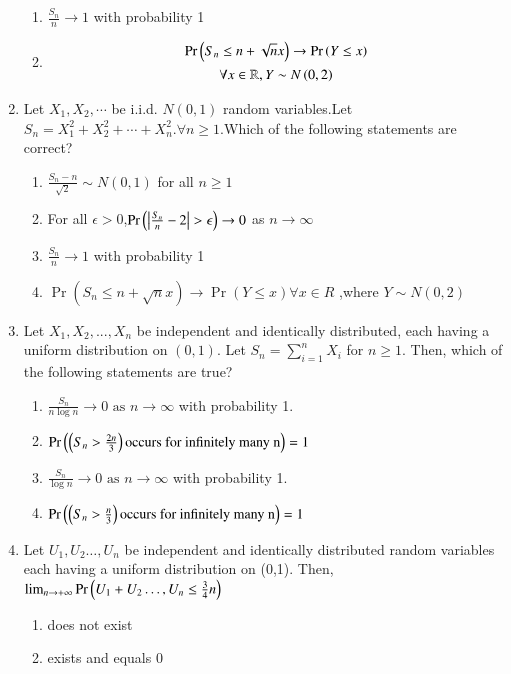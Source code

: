 \begin{enumerate}[label=\thesection.\arabic*.,ref=\thesection.\theenumi]
\begin{enumerate}
\item $\frac{S_{n}}{n} \to 1$ with probability 1
\item 
\begin{multline}
    \Pr\left({S_{n} \leq n+\sqrt{n}x}\right) \to \Pr\left({Y \leq x}\right)
    \\
    \forall x\in \mathbb{R}, Y \sim N\left(0,2\right)
\end{multline}
%
\end{enumerate}
%
\item Let $X_1,X_2, \cdots$ be i.i.d. $N(0,1)$ random variables.Let $S_{n}=X_{1}^2+X_{2}^2+\cdots+X_{n}^2.\forall n\geq 1.$Which of the following statements are correct?
\begin{enumerate}
\setlength\itemsep{1em}
\item $\frac{S_{n}-n}{\sqrt{2}}\sim N(0,1)$ for all $n\geq 1$
\item For all $\epsilon > 0$,$\Pr{\brak{\left|\frac{S_n}{n}-2\right|>\epsilon}}\to 0$ as $n \to \infty$
\item $\frac{S_{n}}{n} \to 1$ with probability 1
\item $\Pr({S_{n} \leq n+\sqrt{n}x}) \to \Pr({Y \leq x}) \forall x\in R$ ,where $Y \sim N(0,2)$
\end{enumerate}
%
\solution

%
\item Let $X_1,X_2,...,X_n$ be independent and identically distributed, each having a uniform distribution on $(0,1)$. Let $S_n=\sum_{i=1}^{n}X_i$ for $n\ge 1$. Then, which of the following statements are true? 
\begin{enumerate}[label=\Alph*)]
\item $\frac{S_n}{n \log{n}}\to 0 \text{ as } n \to \infty$ with probability 1.
\item $\Pr\left(\left(S_n>\frac{2n}{3}\right)\text{occurs for infinitely many n}\right)=1$
\item $\frac{S_n}{\log{n}}\to 0\text{ as } n \to \infty$ with probability 1.
\item $\Pr\left(\left(S_n>\frac{n}{3}\right)\text{occurs for infinitely many n}\right)=1$
\end{enumerate}
%
\solution

%
%
\item Let $U_1,U_2\dots,U_n$ be independent and identically distributed random variables each
having a uniform distribution on (0,1). Then,$\lim_{n \to +\infty} \Pr\left(U_1+U_2\dots,U_n\leq \frac{3}{4}n\right)$
\begin{enumerate}
    \item does not exist
    \item exists and equals 0

\end{enumerate}
\end{enumerate}
